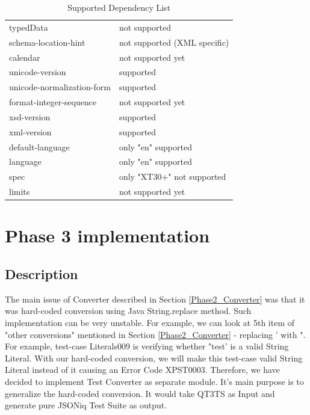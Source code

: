 \begin{table}[]
\begin{tabular}{ll}
		typedData                          & not supported                \\
		schema-location-hint               & not supported (XML specific) \\
		calendar                           & not supported yet            \\
		unicode-version                    & supported                    \\
		unicode-normalization-form         & supported                    \\
		format-integer-sequence            & not supported yet            \\
		xsd-version                        & supported                    \\
		xml-version                        & supported                    \\
		default-language                   & only "en" supported          \\
		language                           & only "en" supported          \\
		spec                               & only "XT30+" not supported   \\
		limits                             & not supported yet           
	\end{tabular}
	\caption{Supported Dependency List }
	\label{tab:Phase2_DependencyList}
\end{table}

\section{Phase 3 implementation}
\subsection{Description}
\label{Phase3_Description}
The main issue of Converter described in Section \ref{Phase2_Converter} was that it was hard-coded conversion using Java String.replace method. Such implementation can be very unstable. For example, we can look at 5th item of "other conversions" mentioned in Section \ref{Phase2_Converter} - replacing ' with ". For example, test-case Literals009 is verifying whether "test' is a valid String Literal. With our hard-coded conversion, we will make this test-case valid String Literal instead of it causing an Error Code XPST0003. Therefore, we have decided to implement Test Converter as separate module. It's main purpose is to generalize the hard-coded conversion. It would take QT3TS as Input and generate pure JSONiq Test Suite as output.

